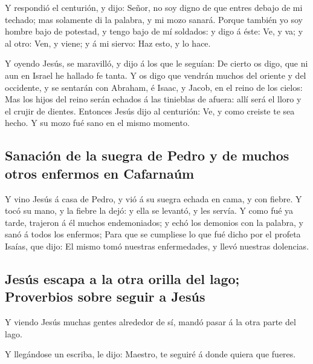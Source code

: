  Y respondió el centurión, y dijo: Señor, no soy digno de
que entres debajo de mi techado; mas solamente di la palabra, y mi mozo
sanará.  Porque también yo soy hombre bajo de potestad, y
tengo bajo de mí soldados: y digo á éste: Ve, y va; y al otro: Ven, y
viene; y á mi siervo: Haz esto, y lo hace.

 Y oyendo Jesús, se maravilló, y dijo á los que le
seguían: De cierto os digo, que ni aun en Israel he hallado fe tanta.
 Y os digo que vendrán muchos del oriente y del
occidente, y se sentarán con Abraham, é Isaac, y Jacob, en el reino de
los cielos:  Mas los hijos del reino serán echados á las
tinieblas de afuera: allí será el lloro y el crujir de dientes.
 Entonces Jesús dijo al centurión: Ve, y como creiste te
sea hecho. Y su mozo fué sano en el mismo momento.

\hypertarget{sanaciuxf3n-de-la-suegra-de-pedro-y-de-muchos-otros-enfermos-en-cafarnauxfam}{%
\subsection{Sanación de la suegra de Pedro y de muchos otros enfermos en
Cafarnaúm}\label{sanaciuxf3n-de-la-suegra-de-pedro-y-de-muchos-otros-enfermos-en-cafarnauxfam}}

 Y vino Jesús á casa de Pedro, y vió á su suegra echada
en cama, y con fiebre.  Y tocó su mano, y la fiebre la
dejó: y ella se levantó, y les servía.  Y como fué ya
tarde, trajeron á él muchos endemoniados; y echó los demonios con la
palabra, y sanó á todos los enfermos;  Para que se
cumpliese lo que fué dicho por el profeta Isaías, que dijo: El mismo
tomó nuestras enfermedades, y llevó nuestras dolencias.

\hypertarget{jesuxfas-escapa-a-la-otra-orilla-del-lago-proverbios-sobre-seguir-a-jesuxfas}{%
\subsection{Jesús escapa a la otra orilla del lago; Proverbios sobre
seguir a
Jesús}\label{jesuxfas-escapa-a-la-otra-orilla-del-lago-proverbios-sobre-seguir-a-jesuxfas}}

 Y viendo Jesús muchas gentes alrededor de sí, mandó
pasar á la otra parte del lago.

 Y llegándose un escriba, le dijo: Maestro, te seguiré á
donde quiera que fueres.

